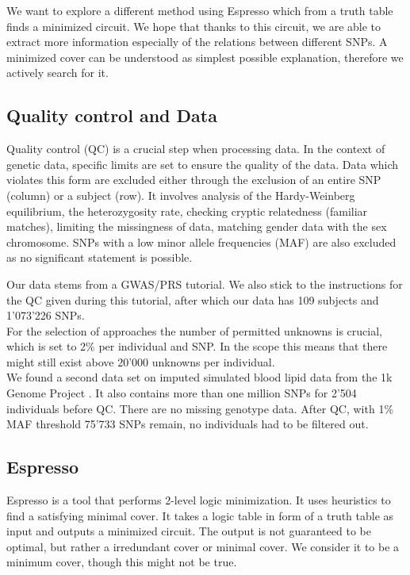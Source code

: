 \documentclass[letterpaper, 11pt]{article}
\begin{document}
We want to explore a different method using Espresso which from a truth table finds a minimized circuit. We hope that thanks to this circuit, we are able to extract more information especially of the relations between different SNPs. A minimized cover can be understood as simplest possible explanation, therefore we actively search for it. 

\subsection {Quality control and Data}
Quality control (QC) is a crucial step when processing data. In the context of genetic data, specific limits are set to ensure the quality of the data. Data which violates this form are excluded either through the exclusion of an entire SNP (column) or a subject (row). It involves analysis of the Hardy-Weinberg equilibrium, the heterozygosity rate, checking cryptic relatedness (familiar matches), limiting the missingness of data, matching gender data with the sex chromosome. SNPs with a low minor allele frequencies (MAF) are also excluded as no significant statement is possible. 

Our data stems from a GWAS/PRS tutorial\cite{tutorial}. We also stick to the instructions for the QC given during this tutorial, after which our data has 109 subjects and 1'073'226 SNPs.  \\

For the selection of approaches the number of permitted unknowns is crucial, which is set to 2\% per individual and SNP. In the scope this means that there might still exist above 20'000 unknowns per individual. \\

We found a second data set on imputed simulated blood lipid data from the 1k Genome Project \cite{1k}. It also contains more than one million SNPs for 2'504 individuals before QC. There are no missing genotype data. After QC, with 1\% MAF threshold 75'733 SNPs remain, no individuals had to be filtered out.\\

\subsection{Espresso}
Espresso is a tool that performs 2-level logic minimization. It uses heuristics to find a satisfying minimal cover. It takes a logic table in form of a truth table as input and outputs a minimized circuit.  The output is not guaranteed to be optimal, but rather a irredundant cover or minimal cover. We consider it to be a minimum cover, though this might not be true.  \\
\end{document}
